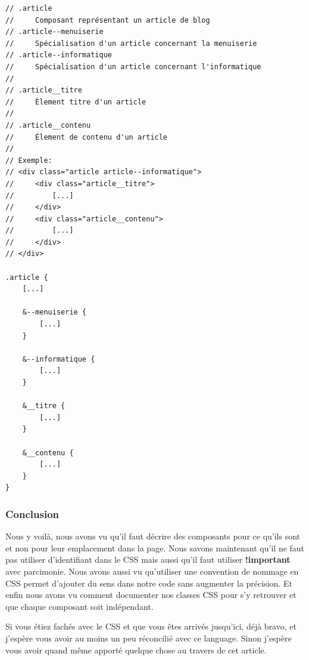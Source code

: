 \documentclass[12pt, a4paper]{report}
\begin{document}
\begin{lstlisting}
// .article
//     Composant représentant un article de blog
// .article--menuiserie
//     Spécialisation d'un article concernant la menuiserie
// .article--informatique
//     Spécialisation d'un article concernant l'informatique
//
// .article__titre
//     Élement titre d'un article
//
// .article__contenu
//     Élement de contenu d'un article
//
// Exemple:
// <div class="article article--informatique">
//     <div class="article__titre">
//         [...]
//     </div>
//     <div class="article__contenu">
//         [...]
//     </div>
// </div>

.article {
    [...]

    &--menuiserie {
        [...]
    }

    &--informatique {
        [...]
    }

    &__titre {
        [...]
    }

    &__contenu {
        [...]
    }
}
\end{lstlisting}

\subsubsection{Conclusion}

Nous y voilà, nous avons vu qu'il faut décrire des composants pour ce qu'ils sont et non pour leur emplacement dans la page.
Nous savons maintenant qu'il ne faut pas utiliser d'identifiant dans le CSS mais aussi qu'il faut utiliser \textbf{!important} avec parcimonie.
Nous avons aussi vu qu'utiliser une convention de nommage en CSS permet d'ajouter du sens dans notre code sans augmenter la précision.
Et enfin nous avons vu comment documenter nos classes CSS pour s'y retrouver et que chaque composant soit indépendant.

Si vous étiez fachés avec le CSS et que vous êtes arrivés jusqu'ici, déjà bravo, et j'espère vous avoir au moins un peu réconcilié avec ce language.
Sinon j'espère vous avoir quand même apporté quelque chose au travers de cet article.

\listoffigures
\makeutbmbackcover{}
\end{document}

